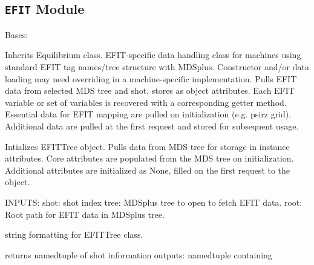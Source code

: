 \documentclass[letterpaper,10pt,english]{sphinxmanual}
\begin{document}
\subsection{\texttt{EFIT} Module}
\label{eqtools:efit-module}\label{eqtools:module-eqtools.EFIT}

\begin{fulllineitems}
\label{eqtools:eqtools.EFIT.EFITTree}
Bases: {\hyperref[eqtools:eqtools.core.Equilibrium]{}}

Inherits Equilibrium class. EFIT-specific data handling class for machines using
standard EFIT tag names/tree structure with MDSplus. Constructor and/or data loading may
need overriding in a machine-specific implementation.
Pulls EFIT data from selected MDS tree and shot, stores as object attributes.
Each EFIT variable or set of variables is recovered with a corresponding getter method.
Essential data for EFIT mapping are pulled on initialization (e.g. psirz grid).
Additional data are pulled at the first request and stored for subsequent usage.

Intializes EFITTree object. Pulls data from MDS tree for storage in
instance attributes. Core attributes are populated from the MDS tree
on initialization. Additional attributes are initialized as None,
filled on the first request to the object.

INPUTS:
shot:   shot index
tree:   MDSplus tree to open to fetch EFIT data.
root:   Root path for EFIT data in MDSplus tree.

\begin{fulllineitems}
\label{eqtools:eqtools.EFIT.EFITTree.__str__}
string formatting for EFITTree class.

\end{fulllineitems}


\begin{fulllineitems}
\label{eqtools:eqtools.EFIT.EFITTree.getInfo}
returns namedtuple of shot information
outputs:
namedtuple containing
\begin{quote}


\end{quote}
\end{fulllineitems}
\end{fulllineitems}
\end{document}
